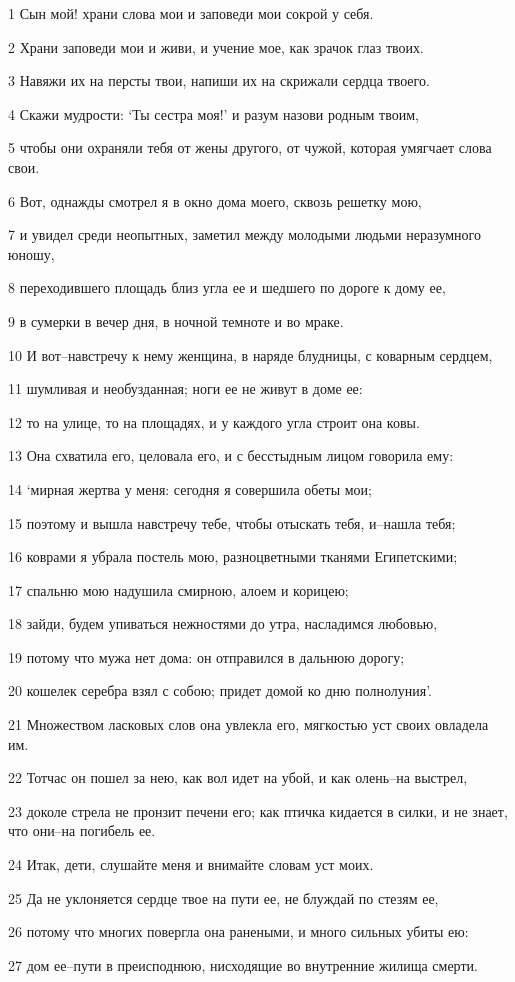 \par 1 Сын мой! храни слова мои и заповеди мои сокрой у себя.
\par 2 Храни заповеди мои и живи, и учение мое, как зрачок глаз твоих.
\par 3 Навяжи их на персты твои, напиши их на скрижали сердца твоего.
\par 4 Скажи мудрости: `Ты сестра моя!' и разум назови родным твоим,
\par 5 чтобы они охраняли тебя от жены другого, от чужой, которая умягчает слова свои.
\par 6 Вот, однажды смотрел я в окно дома моего, сквозь решетку мою,
\par 7 и увидел среди неопытных, заметил между молодыми людьми неразумного юношу,
\par 8 переходившего площадь близ угла ее и шедшего по дороге к дому ее,
\par 9 в сумерки в вечер дня, в ночной темноте и во мраке.
\par 10 И вот--навстречу к нему женщина, в наряде блудницы, с коварным сердцем,
\par 11 шумливая и необузданная; ноги ее не живут в доме ее:
\par 12 то на улице, то на площадях, и у каждого угла строит она ковы.
\par 13 Она схватила его, целовала его, и с бесстыдным лицом говорила ему:
\par 14 `мирная жертва у меня: сегодня я совершила обеты мои;
\par 15 поэтому и вышла навстречу тебе, чтобы отыскать тебя, и--нашла тебя;
\par 16 коврами я убрала постель мою, разноцветными тканями Египетскими;
\par 17 спальню мою надушила смирною, алоем и корицею;
\par 18 зайди, будем упиваться нежностями до утра, насладимся любовью,
\par 19 потому что мужа нет дома: он отправился в дальнюю дорогу;
\par 20 кошелек серебра взял с собою; придет домой ко дню полнолуния'.
\par 21 Множеством ласковых слов она увлекла его, мягкостью уст своих овладела им.
\par 22 Тотчас он пошел за нею, как вол идет на убой, и как олень--на выстрел,
\par 23 доколе стрела не пронзит печени его; как птичка кидается в силки, и не знает, что они--на погибель ее.
\par 24 Итак, дети, слушайте меня и внимайте словам уст моих.
\par 25 Да не уклоняется сердце твое на пути ее, не блуждай по стезям ее,
\par 26 потому что многих повергла она ранеными, и много сильных убиты ею:
\par 27 дом ее--пути в преисподнюю, нисходящие во внутренние жилища смерти.

